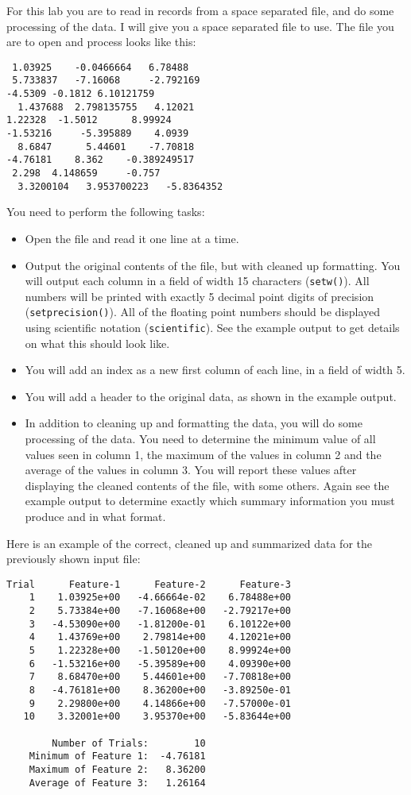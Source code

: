 \documentclass[11pt]{article}
\begin{document}
For this lab you are to read in records from a space separated file, and
do some processing of the data.  I will give you a space separated file
to use.  The file you are to open and process looks like this:

\begin{verbatim}
 1.03925	-0.0466664	 6.78488	
 5.733837	-7.16068	 -2.792169	
-4.5309	-0.1812	6.10121759	
  1.437688	2.798135755	  4.12021	
1.22328	 -1.5012	  8.99924	
-1.53216	 -5.395889	  4.0939	
  8.6847	  5.44601	 -7.70818	
-4.76181	8.362	 -0.389249517	
 2.298	4.148659	 -0.757	
  3.3200104	  3.953700223	-5.8364352
\end{verbatim}

You need to perform the following tasks:

\begin{itemize}
\item Open the file and read it one line at a time.
\item Output the original contents of the file, but with cleaned up
formatting.  You will output each column in a field of width 15
characters (\verb~setw()~).  All numbers will be printed with exactly 5
decimal point digits of precision (\verb~setprecision()~).  All of the
floating point numbers should be displayed using scientific notation
(\verb~scientific~).  See the example output to get details on what
this should look like.
\item You will add an index as a new first column of each line, in a field
of width 5.
\item You will add a header to the original data, as shown in the example
output.
\item In addition to cleaning up and formatting the data, you will do some
processing of the data.  You need to determine the minimum value of
all values seen in column 1, the maximum of the values in column 2
and the average of the values in column 3.  You will report these
values after displaying the cleaned contents of the file, with some
others.  Again see the example output to determine exactly which
summary information you must produce and in what format.
\end{itemize}

Here is an example of the correct, cleaned up and summarized data for
the previously shown input file:

\begin{verbatim}
Trial      Feature-1      Feature-2      Feature-3
    1    1.03925e+00   -4.66664e-02    6.78488e+00
    2    5.73384e+00   -7.16068e+00   -2.79217e+00
    3   -4.53090e+00   -1.81200e-01    6.10122e+00
    4    1.43769e+00    2.79814e+00    4.12021e+00
    5    1.22328e+00   -1.50120e+00    8.99924e+00
    6   -1.53216e+00   -5.39589e+00    4.09390e+00
    7    8.68470e+00    5.44601e+00   -7.70818e+00
    8   -4.76181e+00    8.36200e+00   -3.89250e-01
    9    2.29800e+00    4.14866e+00   -7.57000e-01
   10    3.32001e+00    3.95370e+00   -5.83644e+00

        Number of Trials:        10
    Minimum of Feature 1:  -4.76181
    Maximum of Feature 2:   8.36200
    Average of Feature 3:   1.26164
\end{verbatim}
\end{document}
